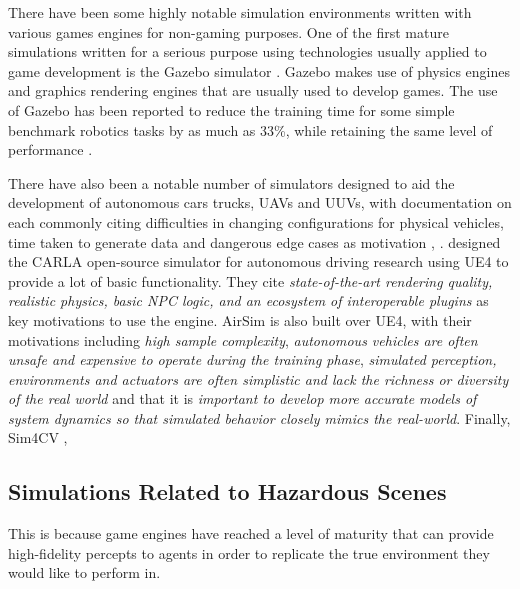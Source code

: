 There have been some highly notable simulation environments written with various games engines for non-gaming purposes. One of the first mature simulations written for a serious purpose using technologies usually applied to game development is the Gazebo simulator \cite{Koenig2005DesignSimulator}. Gazebo makes use of physics engines and graphics rendering engines that are usually used to develop games. The use of Gazebo has been reported to reduce the training time for some simple benchmark robotics tasks by as much as 33\%, while retaining the same level of performance \cite{VilchesRobotGazebo}. 

There have also been a notable number of simulators designed to aid the development of autonomous cars trucks, UAVs and UUVs, with documentation on each commonly citing difficulties in changing configurations for physical vehicles, time taken to generate data and dangerous edge cases as motivation \cite{Dosovitskiy2017CARLA:Simulator} \cite{Wymann2015TORCS:Simulator}, \cite{ShahAirSim:Vehicles} \cite{Bojarski2016EndCars}. \citeauthor{Dosovitskiy2017CARLA:Simulator} designed the CARLA open-source simulator \cite{Dosovitskiy2017CARLA:Simulator} for autonomous driving research using UE4 to provide a lot of basic functionality. They cite \textit{state-of-the-art rendering quality, realistic physics, basic NPC logic, and an ecosystem of interoperable plugins} as key motivations to use the engine. AirSim \cite{ShahAirSim:Vehicles} is also built over UE4, with their motivations including \textit{high sample complexity}, \textit{autonomous vehicles are often unsafe and expensive to operate during the training phase}, \textit{simulated perception, environments and actuators are often simplistic and lack the richness or diversity of the real world} and that it is \textit{important to develop more accurate models of system dynamics so that simulated behavior closely mimics the real-world}. Finally, Sim4CV \cite{Mueller2016ATracking}, 

\subsection{Simulations Related to Hazardous Scenes}


This is because game engines have reached a level of maturity that can provide high-fidelity percepts to agents in order to replicate the true environment they would like to perform in. 



